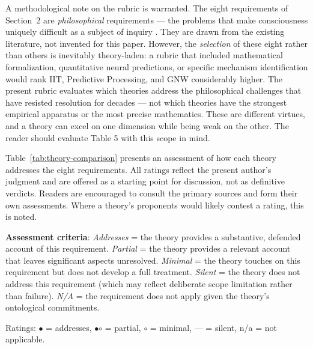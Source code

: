 \documentclass[12pt]{article}
\begin{document}
A methodological note on the rubric is warranted. The eight requirements of Section~2 are \emph{philosophical} requirements --- the problems that make consciousness uniquely difficult as a subject of inquiry \citep{Chalmers1995,Levine1983,Nagel1974,Jackson1982,Bayne2010,Chalmers2018}. They are drawn from the existing literature, not invented for this paper. However, the \emph{selection} of these eight rather than others is inevitably theory-laden: a rubric that included mathematical formalization, quantitative neural predictions, or specific mechanism identification would rank IIT, Predictive Processing, and GNW considerably higher. The present rubric evaluates which theories address the philosophical challenges that have resisted resolution for decades --- not which theories have the strongest empirical apparatus or the most precise mathematics. These are different virtues, and a theory can excel on one dimension while being weak on the other. The reader should evaluate Table 5 with this scope in mind.

Table~\ref{tab:theory-comparison} presents an assessment of how each theory addresses the eight requirements. All ratings reflect the present author's judgment and are offered as a starting point for discussion, not as definitive verdicts. Readers are encouraged to consult the primary sources and form their own assessments. Where a theory's proponents would likely contest a rating, this is noted.

\textbf{Assessment criteria}: \emph{Addresses} = the theory provides a substantive, defended account of this requirement. \emph{Partial} = the theory provides a relevant account that leaves significant aspects unresolved. \emph{Minimal} = the theory touches on this requirement but does not develop a full treatment. \emph{Silent} = the theory does not address this requirement (which may reflect deliberate scope limitation rather than failure). \emph{N/A} = the requirement does not apply given the theory's ontological commitments.

Ratings: {$\bullet$} = addresses, {\large$\bullet$\hspace{-8.5pt}$\circ$} = partial, {$\circ$} = minimal, --- = silent, n/a = not applicable.
\end{document}
